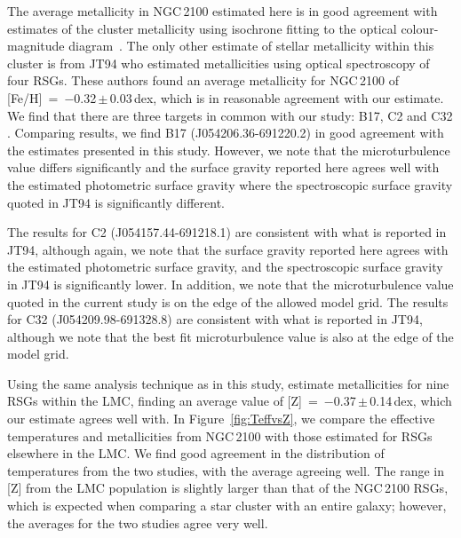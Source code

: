 \documentclass[useAMS,usenatbib]{mn2e}
\begin{document}
The average metallicity in NGC\,2100 estimated here is in good agreement with estimates of the cluster metallicity using isochrone fitting to the optical colour-magnitude diagram~\citep[$-$0.34\,dex;][]{2015A&A...575A..62N}.
The only other estimate of stellar metallicity within this cluster is from JT94
who estimated metallicities using optical spectroscopy of four RSGs.
These authors found an average metallicity for NGC\,2100 of [Fe/H]~=~$-$0.32\,$\pm$\,0.03\,dex, which is in reasonable agreement with our estimate.
We find that there are three targets in common with our study: B17, C2 and C32
\citep[using the][nomenclature]{1974A&AS...15..261R}.
Comparing results, we find B17 (J054206.36-691220.2) in good agreement with the estimates presented in this study.
However, we note that the microturbulence value differs significantly and the surface gravity reported here agrees well with the estimated photometric surface gravity where the spectroscopic surface gravity quoted in JT94 is significantly different.


The results for C2 (J054157.44-691218.1) are consistent with what is reported in JT94, although again, we note that the surface gravity reported here agrees with the estimated photometric surface gravity, and the spectroscopic surface gravity in JT94 is significantly lower.
In addition, we note that the microturbulence value quoted in the current study is on the edge of the allowed model grid.
The results for C32 (J054209.98-691328.8) are consistent with what is reported in JT94, although we note that the best fit microturbulence value is also at the edge of the model grid.


Using the same analysis technique as in this study,
\cite{2015ApJ...806...21D} estimate metallicities for nine RSGs within the LMC,
finding an average value of [Z]~=~$-$0.37\,$\pm$\,0.14\,dex, which our estimate agrees well with.
In Figure~\ref{fig:TeffvsZ}, we compare the effective temperatures and metallicities from NGC\,2100 with those estimated for RSGs elsewhere in the LMC.
We find good agreement in the distribution of temperatures from the two studies, with the average agreeing well.
The range in [Z] from the LMC population is slightly larger than that of the NGC\,2100 RSGs, which is expected when comparing a star cluster with an entire galaxy; however, the averages for the two studies agree very well.
\end{document}
